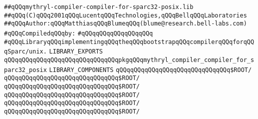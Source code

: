 \label{src/lib/core/mythryl-compiler-compiler/mythryl-compiler-compiler-for-sparc32-posix.lib}
\verb|##qQQqmythryl-compiler-compiler-for-sparc32-posix.lib|\newline
\verb|##qQQq(C)qQQq2001qQQqLucentqQQqTechnologies,qQQqBellqQQqLaboratories|\newline
\verb|##qQQqAuthor:qQQqMatthiasqQQqBlumeqQQq(blume@research.bell-labs.com)|\newline
\newline
\verb|#qQQqCompiledqQQqby:|\newline
\verb|#qQQqqQQqqQQqqQQqqQQq|\newline
\newline
\newline
\newline
\verb|#qQQqLibraryqQQqimplementingqQQqtheqQQqbootstrapqQQqcompilerqQQqforqQQqSparc/unix.|\newline
\newline
\newline
\newline
\verb|LIBRARY_EXPORTS|\newline
\newline
\verb|qQQqqQQqqQQqqQQqqQQqqQQqqQQqqQQqpkgqQQqmythryl_compiler_compiler_for_sparc32_posix|\newline
\newline
\newline
\newline
\verb|LIBRARY_COMPONENTS|\newline
\newline
\verb|qQQqqQQqqQQqqQQqqQQqqQQqqQQqqQQq$ROOT/|\newline
\verb|qQQqqQQqqQQqqQQqqQQqqQQqqQQqqQQq$ROOT/|\newline
\verb|qQQqqQQqqQQqqQQqqQQqqQQqqQQqqQQq$ROOT/|\newline
\verb|qQQqqQQqqQQqqQQqqQQqqQQqqQQqqQQq$ROOT/|\newline
\verb|qQQqqQQqqQQqqQQqqQQqqQQqqQQqqQQq$ROOT/|\newline
\newline
\verb|qQQqqQQqqQQqqQQqqQQqqQQqqQQqqQQq$ROOT/|\newline

